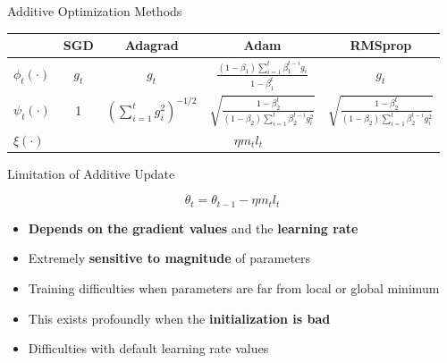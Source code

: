 \begin{frame}{Additive Optimization Methods}  
	\begin{table}
    \renewcommand{\arraystretch}{3.5}
    \begin{tabularx}{\linewidth}{l|c|c|c|c}
      & \textbf{SGD} & \textbf{Adagrad} & \textbf{Adam} & \textbf{RMSprop} \\
      \hline
      \(\phi_{t}(\cdot)\) & \(g_t\) & \(g_t\) &
                                                          \(\frac{(1-\beta_1)\sum_{i=1}^t\beta_1^{t-i}g_i}{1-\beta_1^t}\)
                             &  \(g_t\) \\
      \hline
      \(\psi_{t}(\cdot)\)    &  1  & \( \left( \sum_{i=1}^{t}g_i^2 \right)^{-1/2}\) &
                                                                 \(\sqrt{\frac{1-\beta_2^t}{(1-\beta_2)\sum_{i=1}^{t}\beta_2^{t-i}g_i^2}}\)
                                                          &
                                                            \(\sqrt{\frac{1-\beta_2^t}{(1-\beta_2)\sum_{i=1}^{t}\beta_2^{t-i}g_i^2}}\)\\
      \hline     
      \(\xi(\cdot)\) & \multicolumn{4}{c}{\cellcolor{blue!25}\(\eta m_t l_t\)}
    \end{tabularx}
  \end{table}
\end{frame}

\begin{frame}{Limitation of Additive Update}    
	
    \begin{equation*}
    \theta_t = \theta_{t-1} - \eta m_t l_t
  \end{equation*}
  
  \begin{itemize}
    \item \textbf{Depends on the gradient values} and the \textbf{learning rate}
    \item Extremely \textbf{sensitive to magnitude} of parameters
    \item Training difficulties when parameters are far from local or global
      minimum
    \item This exists profoundly when the \textbf{initialization is bad}
    \item Difficulties with default learning rate values
  \end{itemize}

\end{frame}

